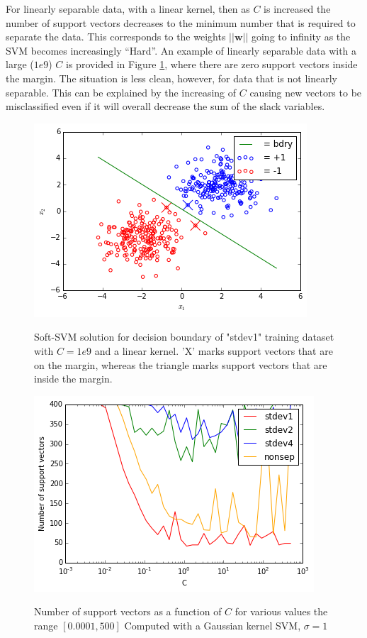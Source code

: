 \documentclass[10pt]{article}
\begin{document}
For linearly separable data, with a linear kernel, then as $C$ is increased the number of support vectors decreases to the minimum number that is required to separate the data.  This corresponds to the weights $||\mathbf{w}||$ going to infinity as the SVM becomes increasingly ``Hard''.  An example of linearly separable data with a large ($1e9$) $C$ is provided in Figure \ref{highC}, where there are zero support vectors inside the margin.  The situation is less clean, however, for data that is not linearly separable.  This can be explained by the increasing of $C$ causing new vectors to be misclassified even if it will overall decrease the sum of the slack variables.
\begin{figure}
\centering
\includegraphics[scale=0.5]{svm_highC_stdev1.png}
\label{highC}
\caption{Soft-SVM solution for decision boundary of "stdev1" training dataset with $C=1e9$ and a linear kernel.  'X' marks support vectors that are on the margin, whereas the triangle marks support vectors that are inside the margin.}
\end{figure}
\begin{figure}
\centering
\includegraphics[scale=0.5]{supportvectors.png}
\label{supportvectors}
\caption{Number of support vectors as a function of $C$ for various values the range $[0.0001, 500]$ Computed with a Gaussian kernel SVM, $\sigma=1$}
\end{figure}
\end{document}
